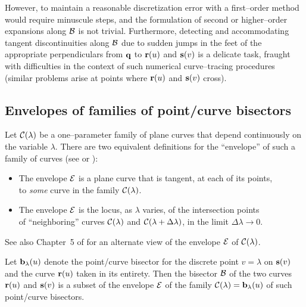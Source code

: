 However, to maintain a reasonable discretization error with
a first--order method would require minuscule steps, and the
formulation of second or higher--order expansions along ${\cal B}$
is not trivial. Furthermore, detecting and accommodating tangent
discontinuities along ${\cal B}$ due to sudden jumps in the feet
of the appropriate perpendiculars from ${\bf q}$ to ${\bf r}(u)$
and ${\bf s}(v)$ is a delicate task, fraught with difficulties
in the context of such numerical curve--tracing procedures
(similar problems arise at points where ${\bf r}(u)$ and
${\bf s}(v)$ cross).

\subsection{Envelopes of families of point/curve bisectors}

Let ${\cal C}(\lambda)$ be a one--parameter family of plane curves
that depend continuously on the variable $\lambda$. There are two
equivalent definitions for the ``envelope'' of such a family of
curves (see \cite[Chapter~4]{boltyanskii64} or \cite[Chapter~5]
{fowler29}):
\begin{itemize}
\item
The envelope ${\cal E}$ is a plane curve that is tangent, at
each of its points, \\ to {\it some\/} curve in the family
${\cal C}(\lambda)$.
\item
The envelope ${\cal E}$ is the locus, as $\lambda$ varies, of
the intersection points \\ of ``neighboring'' curves ${\cal C}
(\lambda)$ and ${\cal C}(\lambda+\Delta\lambda)$, in the limit
$\Delta\lambda \to 0$.
\end{itemize}
See also Chapter~5 of \cite{bruce84} for an alternate view of
the envelope ${\cal E}$ of ${\cal C}(\lambda)$.

\begin{propn}
Let ${\bf b}_\lambda(u)$ denote the point/curve bisector for
the discrete point $v=\lambda$ on ${\bf s}(v)$ and the curve
${\bf r}(u)$ taken in its entirety. Then the bisector ${\cal B}$
of the two curves ${\bf r}(u)$ and ${\bf s}(v)$ is a subset of
the envelope ${\cal E}$ of the family ${\cal C}(\lambda)={\bf b}
_\lambda(u)$ of such point/curve bisectors.
\end{propn}

